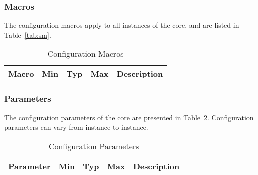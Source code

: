 \ifdefined\SM

\subsubsection{Macros}
\label{sec:cm}

The configuration macros apply to all instances of the core, and are listed in
Table~\ref{tab:sm}.

\begin{longtable}{|l|c|c|c|p{9cm}|}
    \caption{Configuration Macros}\label{tab:sp}\\ \hline
    \rowcolor{iob-green}
    {\bf Macro} & {\bf Min} & {\bf Typ} & {\bf Max} & {\bf Description}
    \\ \hline \hline
    
\end{longtable}
\fi

\ifdefined\SP

\subsubsection{Parameters}
\label{sec:cp}

The configuration parameters of the core are presented in
Table~\ref{tab:sp}. Configuration parameters can vary from instance to instance.

\begin{longtable}{|l|c|c|c|p{9cm}|}
    \caption{Configuration Parameters}\label{tab:sp}\\ \hline
    \rowcolor{iob-green}
    {\bf Parameter} & {\bf Min} & {\bf Typ} & {\bf Max} & {\bf Description}
    \\ \hline \hline
    
\end{longtable}

\fi
